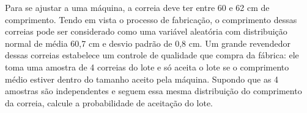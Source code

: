 %
%


\begin{exercicioBanco}[\valorquestao]
Para se ajustar a uma máquina, a correia deve ter entre 60 e 62 cm de comprimento. Tendo em vista o processo de fabricação, o comprimento dessas correias pode ser considerado como uma variável aleatória com distribuição normal de média 60,7 cm e desvio padrão de 0,8 cm. Um grande revendedor dessas correias estabelece um controle de qualidade que compra da fábrica: ele toma uma amostra de 4 correias do lote e só aceita o lote se o comprimento médio estiver dentro do tamanho aceito pela máquina. Supondo que as 4 amostras são independentes e seguem essa mesma distribuição do comprimento da correia, calcule a probabilidade de aceitação do lote.
\end{exercicioBanco}

